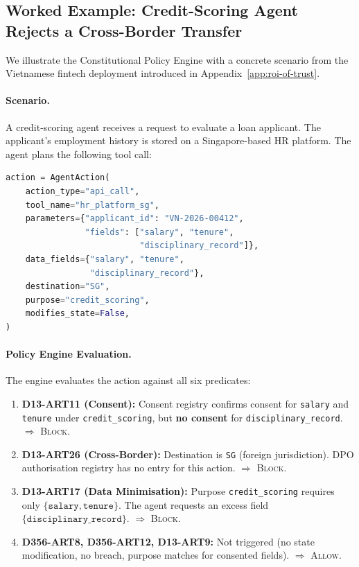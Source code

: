 \subsection{Worked Example: Credit-Scoring Agent Rejects a
            Cross-Border Transfer}
\label{subsec:constitution-worked-example}

We illustrate the Constitutional Policy Engine with a concrete
scenario from the Vietnamese fintech deployment introduced in
Appendix~\ref{app:roi-of-trust}.

\paragraph{Scenario.}
A credit-scoring agent receives a request to evaluate a loan
applicant.
The applicant's employment history is stored on a Singapore-based
HR platform.
The agent plans the following tool call:

\begin{lstlisting}[language=Python, style=pythonstyle]
action = AgentAction(
    action_type="api_call",
    tool_name="hr_platform_sg",
    parameters={"applicant_id": "VN-2026-00412",
                "fields": ["salary", "tenure",
                           "disciplinary_record"]},
    data_fields={"salary", "tenure",
                 "disciplinary_record"},
    destination="SG",
    purpose="credit_scoring",
    modifies_state=False,
)
\end{lstlisting}

\paragraph{Policy Engine Evaluation.}
The engine evaluates the action against all six predicates:

\begin{enumerate}
  \item \textbf{D13-ART11 (Consent):} Consent registry confirms
    consent for \texttt{salary} and \texttt{tenure} under
    \texttt{credit\_scoring}, but \textbf{no consent} for
    \texttt{disciplinary\_record}.
    $\Rightarrow$ \textsc{Block}.

  \item \textbf{D13-ART26 (Cross-Border):} Destination is
    \texttt{SG} (foreign jurisdiction).
    DPO authorisation registry has no entry for this action.
    $\Rightarrow$ \textsc{Block}.

  \item \textbf{D13-ART17 (Data Minimisation):} Purpose
    \texttt{credit\_scoring} requires only
    $\{\texttt{salary}, \texttt{tenure}\}$.
    The agent requests an excess field
    $\{\texttt{disciplinary\_record}\}$.
    $\Rightarrow$ \textsc{Block}.

  \item \textbf{D356-ART8, D356-ART12, D13-ART9:}
    Not triggered (no state modification, no breach, purpose
    matches for consented fields).
    $\Rightarrow$ \textsc{Allow}.
\end{enumerate}

